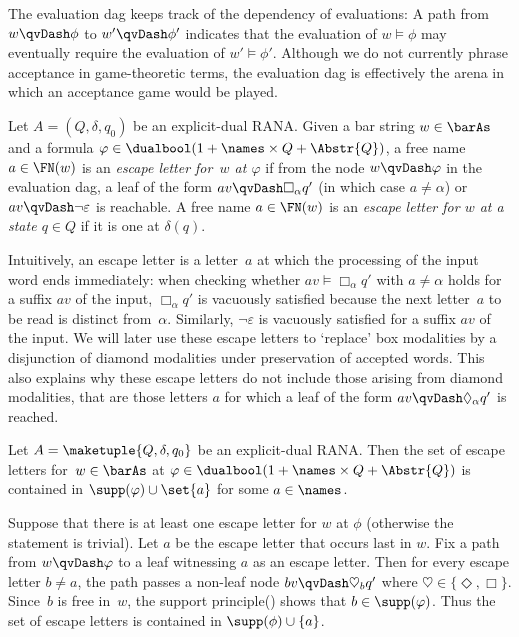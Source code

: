 \documentclass[10pt, final, conference, a4paper, twocolumn]{IEEEtran}
\renewcommand{\enquote}[1]{`#1'}
\begin{document}
\noindent The evaluation dag keeps track of the dependency of evaluations: A path from $w\qvDash \phi$ to $w'\qvDash \phi'$ indicates that the evaluation of $w\models \phi$ may eventually require the evaluation of $w'\models \phi'$.
Although we do not currently phrase acceptance in
    game-theoretic terms, the evaluation dag is effectively the
    arena in which an acceptance game would be played.

\begin{defn}
Let $A=(Q,\delta,q_0)$ be an explicit-dual RANA. Given 
      a bar string $w\in\barAs$ and a 
      formula $\varphi\in\dualbool(1 + \names \times Q + \Abstr{Q})$,
      a free name $a \in \FN(w)$ is an 
      \emph{escape letter for~$w$ at $\varphi$} if from the node
      $w\qvDash\varphi$ in the evaluation dag, 
      a leaf of the form $av \qvDash \Box_\alpha q'$ (in
      which case $a\neq\alpha$) or $av \qvDash \neg\varepsilon$ is reachable. A free name $a 
      \in \FN(w)$ is an \emph{escape letter for $w$ at a state
      $q \in Q$} if it is one at $\delta(q)$.
\end{defn}

Intuitively, an {escape letter} is a letter~$a$ at which the processing of the input word ends
immediately: when checking whether $av \vDash \Box_\alpha q'$ with $a\neq\alpha$ holds for a
suffix $av$ of the input, $\Box_\alpha q'$ is vacuously satisfied because the next letter~$a$
to be read is distinct from~$\alpha$. 
Similarly, $\neg\varepsilon$ is vacuously satisfied for a suffix $av$ of the input.
We will later use these escape letters to \enquote{replace} box modalities by a disjunction
of diamond modalities under preservation of accepted words. This also explains why these
escape letters do not include those arising from diamond modalities, that are those letters
$a$ for which a leaf of the form $av \qvDash \Diamond_\alpha q'$ is reached. 


\begin{lem}\label{lem:boundEscapes}
  Let $A = \maketuple{Q, \delta, q_0}$ be an explicit-dual RANA. 
  Then the set of escape letters for~$w\in \barAs$ at $\varphi \in
  \dualbool(1 + \names \times Q + \Abstr{Q})$ is contained in $\supp(\varphi) \cup \set{a}$
  for some $a \in \names$. 
\end{lem}
\begin{IEEEproof}
  Suppose that there is at least one escape letter for $w$ at $\phi$ (otherwise the statement is trivial). Let $a$ be the escape letter that occurs last in $w$. Fix a path 
  from $w\qvDash\varphi$ to a leaf witnessing $a$ 
  as an escape letter. Then for every escape letter $b\neq a$, the path passes a non-leaf node
  $bv\qvDash \heartsuit_bq'$ where
  $\heartsuit\in\{\Diamond,\Box\}$. Since~$b$ is free in~$w$, the support principle() shows that
  $b \in \supp(\varphi)$. Thus the set of escape letters is contained in $\supp(\phi)\cup \{a\}$.
\end{IEEEproof}
\end{document}
